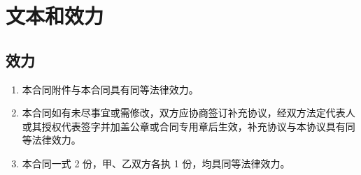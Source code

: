 \section{文本和效力}

\subsection{效力}
\begin{enumerate}
  \item 本合同附件与本合同具有同等法律效力。
  \item 本合同如有未尽事宜或需修改，双方应协商签订补充协议，经双方法定代表人或其授权代表签字并加盖公章或合同专用章后生效，补充协议与本协议具有同等法律效力。
  \item 本合同一式 2 份，甲、乙双方各执 1 份，均具同等法律效力。
\end{enumerate}
